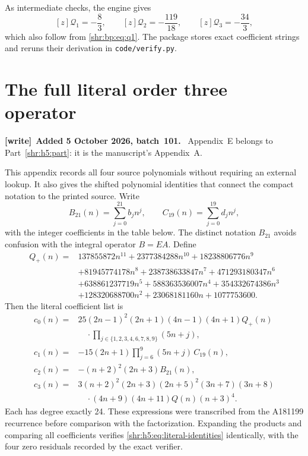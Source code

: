 \documentclass[11pt,letterpaper]{article}
\numberwithin{equation}{section}
\theoremstyle{definition}
\newcommand{\1}{\mathbf 1}
\newenvironment{writenote}[1][]{\par\smallskip\begingroup\small
 \noindent\textbf{[write]}\if\relax\detokenize{#1}\relax\else~\textbf{#1.}\fi\ }%
 {\par\endgroup\smallskip}
\begin{document}
As intermediate checks, the engine gives
\[
 [z]\mathcal Q_1=-\frac83,\qquad
 [z]\mathcal Q_2=-\frac{119}{18},\qquad
 [z]\mathcal Q_3=-\frac{34}{3},
\]
which also follow from \eqref{shr:bp:eq:q1}. The package stores exact coefficient
strings and reruns their derivation in \texttt{code/verify.py}.

\section{The full literal order three operator}
\label{shr:h5:app:literal}
\begin{writenote}[Added 5 October 2026, batch~101]
Appendix~E belongs to Part~\ref{shr:h5:part}: it is the manuscript's
Appendix~A.
\end{writenote}
This appendix records all four source polynomials without requiring an
external lookup. It also gives the shifted polynomial identities that
connect the compact notation to the printed source. Write
\[
 B_{21}(n)=\sum_{j=0}^{21}b_jn^j,\qquad
 C_{19}(n)=\sum_{j=0}^{19}d_jn^j,
\]
with the integer coefficients in the table below. The distinct notation
$B_{21}$ avoids confusion with the integral operator $B=EA$.
Define
\begin{align}
 Q_+(n)={}&137855872n^{11}+2377384288n^{10}+18238806776n^9\\
 &+81945774178n^8+238738633847n^7+471293180347n^6\\
 &+638861237719n^5+588363536007n^4+354332674386n^3\\
 &+128320688700n^2+23068181160n+1077753600.
 \label{shr:h5:eq:Qplus}
\end{align}
Then the literal coefficient list is
\begin{align}
 c_0(n)={}&25(2n-1)^2(2n+1)(4n-1)(4n+1)Q_+(n)\\
          &\hspace{1em}\cdot\prod_{j\in\{1,2,3,4,6,7,8,9\}}(5n+j),\\
 c_1(n)={}&-15(2n+1)\prod_{j=6}^9(5n+j)\,C_{19}(n),\\
 c_2(n)={}&-(n+2)^2(2n+3)B_{21}(n),\\
 c_3(n)={}&3(n+2)^2(2n+3)(2n+5)^2(3n+7)(3n+8)\\
          &\hspace{1em}\cdot(4n+9)(4n+11)Q(n)(n+3)^4.
 \label{shr:h5:eq:literal-coefficients}
\end{align}
Each has degree exactly 24. These expressions were transcribed from the
A181199 recurrence before comparison with the factorization. Expanding
the products and comparing all coefficients verifies
\eqref{shr:h5:eq:literal-identities} identically, with the four zero residuals
recorded by the exact verifier.
\end{document}

